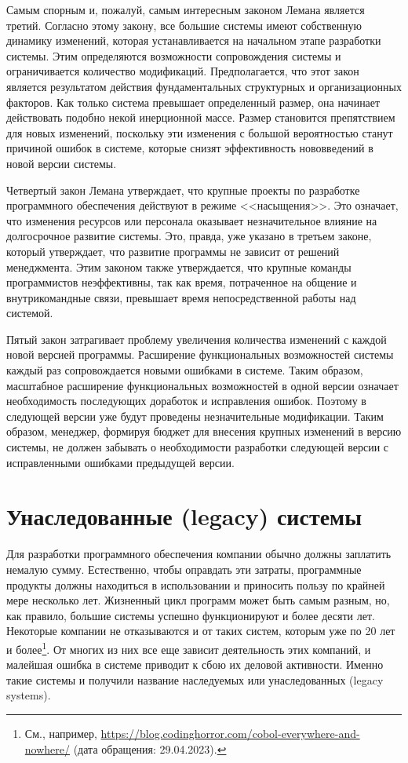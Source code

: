\documentclass{../../text-style}
\begin{document}
Самым спорным и, пожалуй, самым интересным законом Лемана является третий. Согласно этому закону, все большие системы имеют собственную динамику изменений, которая устанавливается на начальном этапе разработки системы. Этим определяются возможности сопровождения системы и ограничивается количество модификаций. Предполагается, что этот закон является результатом действия фундаментальных структурных и организационных факторов. Как только система превышает определенный размер, она начинает действовать подобно некой инерционной массе. Размер становится препятствием для новых изменений, поскольку эти изменения с большой вероятностью станут причиной ошибок в системе, которые снизят эффективность нововведений в новой версии системы.

Четвертый закон Лемана утверждает, что крупные проекты по разработке программного обеспечения действуют в режиме <<насыщения>>. Это означает, что изменения ресурсов или персонала оказывает незначительное влияние на долгосрочное развитие системы. Это, правда, уже указано в третьем законе, который утверждает, что развитие программы не зависит от решений менеджмента. Этим законом также утверждается, что крупные команды программистов неэффективны, так как время, потраченное на общение и внутрикомандные связи, превышает время непосредственной работы над системой.

Пятый закон затрагивает проблему увеличения количества изменений с каждой новой версией программы. Расширение функциональных возможностей системы каждый раз сопровождается новыми ошибками в системе. Таким образом, масштабное расширение функциональных возможностей в одной версии означает необходимость последующих доработок и исправления ошибок. Поэтому в следующей версии уже будут проведены незначительные модификации. Таким образом, менеджер, формируя бюджет для внесения крупных изменений в версию системы, не должен забывать о необходимости разработки следующей версии с исправленными ошибками предыдущей версии.

\section{Унаследованные (legacy) системы}

Для разработки программного обеспечения компании обычно должны заплатить немалую сумму. Естественно, чтобы оправдать эти затраты, программные продукты должны находиться в использовании и приносить пользу по крайней мере несколько лет. Жизненный цикл программ может быть самым разным, но, как правило, большие системы успешно функционируют и более десяти лет. Некоторые компании не отказываются и от таких систем, которым уже по 20 лет и более\footnote{См., например, \url{https://blog.codinghorror.com/cobol-everywhere-and-nowhere/} (дата обращения: 29.04.2023).}. От многих из них все еще зависит деятельность этих компаний, и малейшая ошибка в системе приводит к сбою их деловой активности. Именно такие системы и получили название наследуемых или унаследованных (legacy systems).
\end{document}
